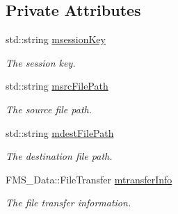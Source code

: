 \subsection*{Private Attributes}
\begin{DoxyCompactItemize}
\item 
\hypertarget{classFileTransferProxy_a5a3760aa18079a96642078aea984a28d}{
std::string \hyperlink{classFileTransferProxy_a5a3760aa18079a96642078aea984a28d}{msessionKey}}
\label{classFileTransferProxy_a5a3760aa18079a96642078aea984a28d}

\begin{DoxyCompactList}\small\item\em The session key. \item\end{DoxyCompactList}\item 
\hypertarget{classFileTransferProxy_a2dc123643d24f601cb55fe1a45e087cd}{
std::string \hyperlink{classFileTransferProxy_a2dc123643d24f601cb55fe1a45e087cd}{msrcFilePath}}
\label{classFileTransferProxy_a2dc123643d24f601cb55fe1a45e087cd}

\begin{DoxyCompactList}\small\item\em The source file path. \item\end{DoxyCompactList}\item 
\hypertarget{classFileTransferProxy_a41dd18ac80e4bb253797e0df85d81730}{
std::string \hyperlink{classFileTransferProxy_a41dd18ac80e4bb253797e0df85d81730}{mdestFilePath}}
\label{classFileTransferProxy_a41dd18ac80e4bb253797e0df85d81730}

\begin{DoxyCompactList}\small\item\em The destination file path. \item\end{DoxyCompactList}\item 
\hypertarget{classFileTransferProxy_a34e37989dbb445cdf3c51d1de30b4853}{
FMS\_\-Data::FileTransfer \hyperlink{classFileTransferProxy_a34e37989dbb445cdf3c51d1de30b4853}{mtransferInfo}}
\label{classFileTransferProxy_a34e37989dbb445cdf3c51d1de30b4853}

\begin{DoxyCompactList}\small\item\em The file transfer information. \item\end{DoxyCompactList}\end{DoxyCompactItemize}


